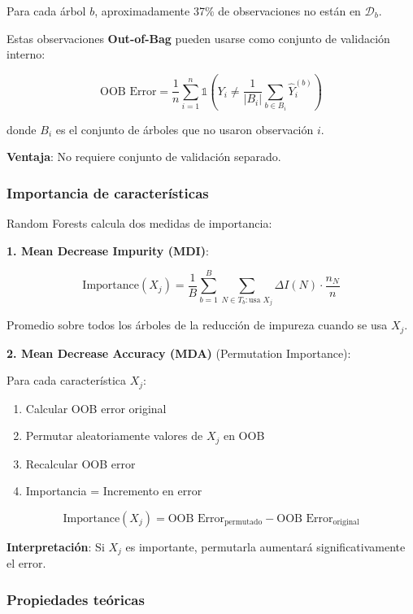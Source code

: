 \documentclass[
  doc,
  floatsintext,
  longtable,
  a4paper,
  nolmodern,
  notxfonts,
  notimes,
  12pt,
  colorlinks=true,linkcolor=blue,citecolor=blue,urlcolor=blue]{apa7}
\providecommand{\tightlist}{%
  \setlength{\itemsep}{0pt}\setlength{\parskip}{0pt}}
\begin{document}
Para cada árbol \(b\), aproximadamente 37\% de observaciones no están en
\(\mathcal{D}_b\).

Estas observaciones \textbf{Out-of-Bag} pueden usarse como conjunto de
validación interno:

\[
\text{OOB Error} = \frac{1}{n} \sum_{i=1}^{n} \mathbb{1}\left(Y_i \neq \frac{1}{|B_i|}\sum_{b \in B_i} \hat{Y}_i^{(b)}\right)
\]

donde \(B_i\) es el conjunto de árboles que no usaron observación \(i\).

\textbf{Ventaja}: No requiere conjunto de validación separado.

\subsubsection{Importancia de
características}\label{importancia-de-caracteruxedsticas-1}

Random Forests calcula dos medidas de importancia:

\textbf{1. Mean Decrease Impurity (MDI)}:

\[
\text{Importance}(X_j) = \frac{1}{B} \sum_{b=1}^{B} \sum_{N \in T_b : \text{usa } X_j} \Delta I(N) \cdot \frac{n_N}{n}
\]

Promedio sobre todos los árboles de la reducción de impureza cuando se
usa \(X_j\).

\textbf{2. Mean Decrease Accuracy (MDA)} (Permutation Importance):

Para cada característica \(X_j\):

\begin{enumerate}
\def\labelenumi{\arabic{enumi}.}
\tightlist
\item
  Calcular OOB error original
\item
  Permutar aleatoriamente valores de \(X_j\) en OOB
\item
  Recalcular OOB error
\item
  Importancia = Incremento en error
\end{enumerate}

\[
\text{Importance}(X_j) = \text{OOB Error}_{\text{permutado}} - \text{OOB Error}_{\text{original}}
\]

\textbf{Interpretación}: Si \(X_j\) es importante, permutarla aumentará
significativamente el error.

\subsubsection{Propiedades teóricas}\label{propiedades-teuxf3ricas-1}
\end{document}
